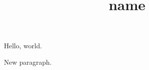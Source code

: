 \documentclass[fontsize=11pt,DIV=calc]{scrartcl}
\title{{{name}}}
\author{}
\date{}
\begin{document}
Hello, world.

New paragraph.
\end{document}
